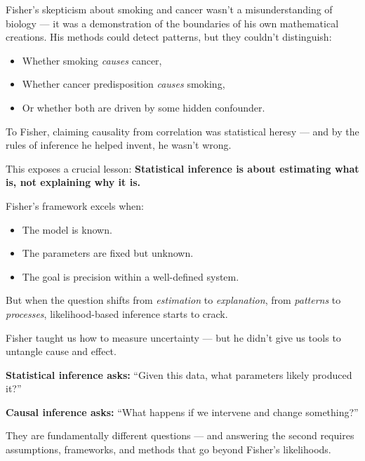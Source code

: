 \medskip

Fisher’s skepticism about smoking and cancer wasn’t a misunderstanding of biology — it was a demonstration of the boundaries of his own mathematical creations. His methods could detect patterns, but they couldn’t distinguish:

\begin{itemize}
    \item Whether smoking \emph{causes} cancer,
    \item Whether cancer predisposition \emph{causes} smoking,
    \item Or whether both are driven by some hidden confounder.
\end{itemize}

To Fisher, claiming causality from correlation was statistical heresy — and by the rules of inference he helped invent, he wasn’t wrong.

\medskip

This exposes a crucial lesson:  
\textbf{Statistical inference is about estimating what is, not explaining why it is.}

Fisher’s framework excels when:
\begin{itemize}
    \item The model is known.
    \item The parameters are fixed but unknown.
    \item The goal is precision within a well-defined system.
\end{itemize}

But when the question shifts from \emph{estimation} to \emph{explanation}, from \emph{patterns} to \emph{processes}, likelihood-based inference starts to crack.

\medskip

\begin{tcolorbox}[colback=gray!5, colframe=black, title=\textbf{Correlation, Causation, and the Missing Toolkit}]
Fisher taught us how to measure uncertainty — but he didn’t give us tools to untangle cause and effect.

\textbf{Statistical inference asks:}  
\quad “Given this data, what parameters likely produced it?”

\textbf{Causal inference asks:}  
\quad “What happens if we intervene and change something?”

They are fundamentally different questions — and answering the second requires assumptions, frameworks, and methods that go beyond Fisher’s likelihoods.
\end{tcolorbox}

